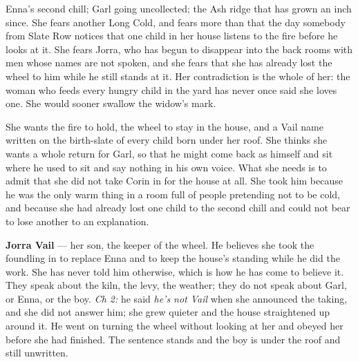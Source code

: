 \documentclass{design/chronicle}
\begin{document}
{
Enna’s second chill; Garl going uncollected; the Ash ridge that has grown an inch since. She fears another Long Cold, and fears more than that the day somebody from Slate Row notices that one child in her house listens to the fire before he looks at it. She fears Jorra, who has begun to disappear into the back rooms with men whose names are not spoken, and she fears that she has already lost the wheel to him while he still stands at it. Her contradiction is the whole of her: the woman who feeds every hungry child in the yard has never once said she loves one. She would sooner swallow the widow’s mark.

She wants the fire to hold, the wheel to stay in the house, and a Vail name written on the birth-slate of every child born under her roof. She thinks she wants a whole return for Garl, so that he might come back as himself and sit where he used to sit and say nothing in his own voice. What she needs is to admit that she did not take Corin in for the house at all. She took him because he was the only warm thing in a room full of people pretending not to be cold, and because she had already lost one child to the second chill and could not bear to lose another to an explanation.

\textbf{Jorra Vail} — her son, the keeper of the wheel. He believes she took the foundling in to replace Enna and to keep the house’s standing while he did the work. She has never told him otherwise, which is how he has come to believe it. They speak about the kiln, the levy, the weather; they do not speak about Garl, or Enna, or the boy. \emph{Ch 2:} he said \emph{he’s not Vail} when she announced the taking, and she did not answer him; she grew quieter and the house straightened up around it. He went on turning the wheel without looking at her and obeyed her before she had finished. The sentence stands and the boy is under the roof and still unwritten.

}
\end{document}
